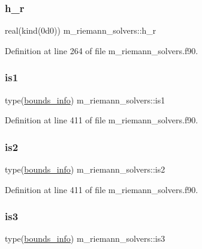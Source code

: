 \subsubsection{\texorpdfstring{h\+\_\+r}{h\_r}}
{\footnotesize\ttfamily real(kind(0d0)) m\+\_\+riemann\+\_\+solvers\+::h\+\_\+r}



Definition at line 264 of file m\+\_\+riemann\+\_\+solvers.\+f90.

\mbox{\label{namespacem__riemann__solvers_ad7ef4f9e239961cacd291ee2e31bf0be}} 
\subsubsection{\texorpdfstring{is1}{is1}}
{\footnotesize\ttfamily type(\hyperlink{structm__derived__types_1_1bounds__info}{bounds\+\_\+info}) m\+\_\+riemann\+\_\+solvers\+::is1}



Definition at line 411 of file m\+\_\+riemann\+\_\+solvers.\+f90.

\mbox{\label{namespacem__riemann__solvers_ad0d94c92ddccee51dc2412707fcab447}} 
\subsubsection{\texorpdfstring{is2}{is2}}
{\footnotesize\ttfamily type(\hyperlink{structm__derived__types_1_1bounds__info}{bounds\+\_\+info}) m\+\_\+riemann\+\_\+solvers\+::is2}



Definition at line 411 of file m\+\_\+riemann\+\_\+solvers.\+f90.

\mbox{\label{namespacem__riemann__solvers_a90256be0540e3f9279305be0e9ab32f4}} 
\subsubsection{\texorpdfstring{is3}{is3}}
{\footnotesize\ttfamily type(\hyperlink{structm__derived__types_1_1bounds__info}{bounds\+\_\+info}) m\+\_\+riemann\+\_\+solvers\+::is3}



